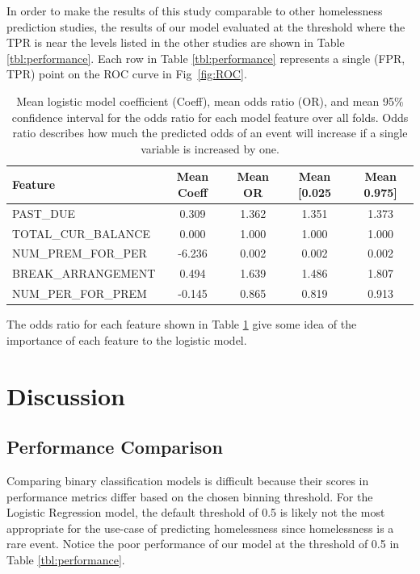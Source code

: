 \documentclass[10pt,letterpaper]{article}
\begin{document}
In order to make the results of this study comparable to other homelessness prediction studies, the results of our model evaluated at the threshold where the TPR is near the levels listed in the other studies are shown in Table \ref{tbl:performance}. Each row in Table \ref{tbl:performance} represents a single (FPR, TPR) point on the ROC curve in Fig~\ref{fig:ROC}. 

\begin{table}[!h]
    \begin{tabular}{lcccc}
    \toprule
              Feature &  Mean Coeff &  Mean OR &  Mean [0.025 &  Mean 0.975] \\
    \midrule
    PAST\_DUE &       0.309 &    1.362 &        1.351 &        1.373 \\
    TOTAL\_CUR\_BALANCE &       0.000 &    1.000 &        1.000 &        1.000 \\
     NUM\_PREM\_FOR\_PER &      -6.236 &    0.002 &        0.002 &        0.002 \\
    BREAK\_ARRANGEMENT &       0.494 &    1.639 &        1.486 &        1.807 \\
     NUM\_PER\_FOR\_PREM &      -0.145 &    0.865 &        0.819 &        0.913 \\
    \bottomrule
    \end{tabular}
    \caption{Mean logistic model coefficient (Coeff), mean odds ratio (OR), and mean 95\% confidence interval for the odds ratio for each model feature over all folds. Odds ratio describes how much the predicted odds of an event will increase if a single variable is increased by one.}
    \label{tbl:meanParams}
\end{table}

The odds ratio for each feature shown in Table \ref{tbl:meanParams} give some idea of the importance of each feature to the logistic model. 

\section*{Discussion}
\subsection*{Performance Comparison}
Comparing binary classification models is difficult because their scores in performance metrics differ based on the chosen binning threshold. For the Logistic Regression model, the default threshold of 0.5 is likely not the most appropriate for the use-case of predicting homelessness since homelessness is a rare event. Notice the poor performance of our model at the threshold of 0.5 in Table \ref{tbl:performance}. 
\end{document}
